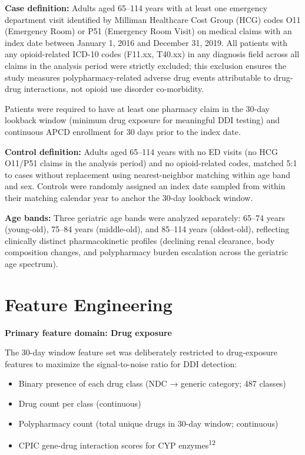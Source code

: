 \documentclass[
  12pt,
]{book}
\providecommand{\tightlist}{%
  \setlength{\itemsep}{0pt}\setlength{\parskip}{0pt}}
\begin{document}
\textbf{Case definition:} Adults aged 65--114 years with at least one
emergency department visit identified by Milliman Healthcare Cost Group
(HCG) codes O11 (Emergency Room) or P51 (Emergency Room Visit) on
medical claims with an index date between January 1, 2016 and December
31, 2019. All patients with any opioid-related ICD-10 codes (F11.xx,
T40.xx) in any diagnosis field across all claims in the analysis period
were strictly excluded; this exclusion ensures the study measures
polypharmacy-related adverse drug events attributable to drug-drug
interactions, not opioid use disorder co-morbidity.

Patients were required to have at least one pharmacy claim in the 30-day
lookback window (minimum drug exposure for meaningful DDI testing) and
continuous APCD enrollment for 30 days prior to the index date.

\textbf{Control definition:} Adults aged 65--114 years with no ED visits
(no HCG O11/P51 claims in the analysis period) and no opioid-related
codes, matched 5:1 to cases without replacement using nearest-neighbor
matching within age band and sex. Controls were randomly assigned an
index date sampled from within their matching calendar year to anchor
the 30-day lookback window.

\textbf{Age bands:} Three geriatric age bands were analyzed separately:
65--74 years (young-old), 75--84 years (middle-old), and 85--114 years
(oldest-old), reflecting clinically distinct pharmacokinetic profiles
(declining renal clearance, body composition changes, and polypharmacy
burden escalation across the geriatric age spectrum).

\section{Feature Engineering}\label{sec-features}

\textbf{Primary feature domain: Drug exposure}

The 30-day window feature set was deliberately restricted to
drug-exposure features to maximize the signal-to-noise ratio for DDI
detection:

\begin{itemize}
\tightlist
\item
  Binary presence of each drug class (NDC → generic category; 487
  classes)
\item
  Drug count per class (continuous)
\item
  Polypharmacy count (total unique drugs in 30-day window; continuous)
\item
  CPIC gene-drug interaction scores for CYP enzymes\textsuperscript{12}
\end{itemize}
\end{document}
